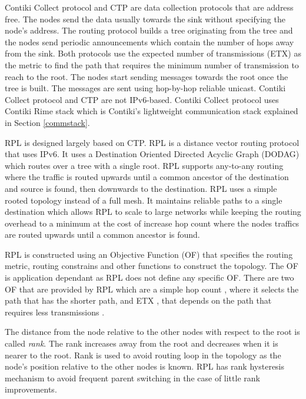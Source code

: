 Contiki Collect protocol and CTP are data collection protocols that are address free. The nodes send the data usually towards the sink without specifying the node's address. The routing protocol builds a tree originating from the tree and the nodes send periodic announcements which contain the number of hops away from the sink. Both protocols use the expected number of transmissions (ETX) as the metric to find the path that requires the minimum number of transmission to reach to the root. The nodes start sending messages towards the root once the tree is built. The messages are sent using hop-by-hop reliable unicast.
Contiki Collect protocol and CTP are not IPv6-based. Contiki Collect protocol uses Contiki Rime stack which is Contiki's lightweight communication stack explained in Section \ref{commstack}. 

RPL is designed largely based on CTP. RPL is a distance vector routing protocol that uses IPv6. It uses a Destination Oriented Directed Acyclic Graph (DODAG) which routes over a tree with a single root. RPL supports any-to-any routing where the traffic is routed upwards until a common ancestor of the destination and source is found, then downwards to the destination. RPL uses a simple rooted topology instead of a full mesh. It maintains reliable paths to a single destination which allows RPL to scale to large networks while keeping the routing overhead to a minimum at the cost of increase hop count where the nodes traffics are routed upwards until a common ancestor is found. 

RPL is constructed using an Objective Function (OF) that specifies the routing metric, routing constrains and other functions to construct the topology. The OF is application dependant as RPL does not define any specific OF. There are two OF that are provided by RPL which are a simple hop count \cite{of0}, where it selects the path that has the shorter path, and ETX \cite{mrhof}, that depends on the path that requires less transmissions \cite{routingmetrics, tsiftes_framework_2010, tsvetkov2011rpl}.

The distance from the node relative to the other nodes with respect to the root is called \textit{rank}. The rank increases away from the root and decreases when it is nearer to the root. Rank is used to avoid routing loop in the topology as the node's position relative to the other nodes is known. RPL has rank hysteresis mechanism to avoid frequent parent switching in the case of little rank improvements.

